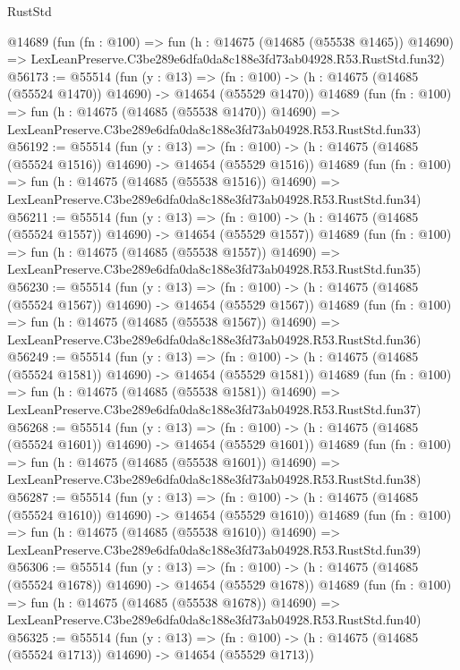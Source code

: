 \begin{lexlean}{RustStd}
\begin{coremodule}
    @14689
    (fun (fn : @100) =>
    fun (h : @14675 (@14685 (@55538 @1465)) @14690) =>
    LexLeanPreserve.C3be289e6dfa0da8c188e3fd73ab04928.R53.RustStd.fun32)
@56173 := @55514
    (fun (y : @13) =>
    (fn : @100) -> (h : @14675 (@14685 (@55524 @1470)) @14690) -> @14654 (@55529 @1470))
    @14689
    (fun (fn : @100) =>
    fun (h : @14675 (@14685 (@55538 @1470)) @14690) =>
    LexLeanPreserve.C3be289e6dfa0da8c188e3fd73ab04928.R53.RustStd.fun33)
@56192 := @55514
    (fun (y : @13) =>
    (fn : @100) -> (h : @14675 (@14685 (@55524 @1516)) @14690) -> @14654 (@55529 @1516))
    @14689
    (fun (fn : @100) =>
    fun (h : @14675 (@14685 (@55538 @1516)) @14690) =>
    LexLeanPreserve.C3be289e6dfa0da8c188e3fd73ab04928.R53.RustStd.fun34)
@56211 := @55514
    (fun (y : @13) =>
    (fn : @100) -> (h : @14675 (@14685 (@55524 @1557)) @14690) -> @14654 (@55529 @1557))
    @14689
    (fun (fn : @100) =>
    fun (h : @14675 (@14685 (@55538 @1557)) @14690) =>
    LexLeanPreserve.C3be289e6dfa0da8c188e3fd73ab04928.R53.RustStd.fun35)
@56230 := @55514
    (fun (y : @13) =>
    (fn : @100) -> (h : @14675 (@14685 (@55524 @1567)) @14690) -> @14654 (@55529 @1567))
    @14689
    (fun (fn : @100) =>
    fun (h : @14675 (@14685 (@55538 @1567)) @14690) =>
    LexLeanPreserve.C3be289e6dfa0da8c188e3fd73ab04928.R53.RustStd.fun36)
@56249 := @55514
    (fun (y : @13) =>
    (fn : @100) -> (h : @14675 (@14685 (@55524 @1581)) @14690) -> @14654 (@55529 @1581))
    @14689
    (fun (fn : @100) =>
    fun (h : @14675 (@14685 (@55538 @1581)) @14690) =>
    LexLeanPreserve.C3be289e6dfa0da8c188e3fd73ab04928.R53.RustStd.fun37)
@56268 := @55514
    (fun (y : @13) =>
    (fn : @100) -> (h : @14675 (@14685 (@55524 @1601)) @14690) -> @14654 (@55529 @1601))
    @14689
    (fun (fn : @100) =>
    fun (h : @14675 (@14685 (@55538 @1601)) @14690) =>
    LexLeanPreserve.C3be289e6dfa0da8c188e3fd73ab04928.R53.RustStd.fun38)
@56287 := @55514
    (fun (y : @13) =>
    (fn : @100) -> (h : @14675 (@14685 (@55524 @1610)) @14690) -> @14654 (@55529 @1610))
    @14689
    (fun (fn : @100) =>
    fun (h : @14675 (@14685 (@55538 @1610)) @14690) =>
    LexLeanPreserve.C3be289e6dfa0da8c188e3fd73ab04928.R53.RustStd.fun39)
@56306 := @55514
    (fun (y : @13) =>
    (fn : @100) -> (h : @14675 (@14685 (@55524 @1678)) @14690) -> @14654 (@55529 @1678))
    @14689
    (fun (fn : @100) =>
    fun (h : @14675 (@14685 (@55538 @1678)) @14690) =>
    LexLeanPreserve.C3be289e6dfa0da8c188e3fd73ab04928.R53.RustStd.fun40)
@56325 := @55514
    (fun (y : @13) =>
    (fn : @100) -> (h : @14675 (@14685 (@55524 @1713)) @14690) -> @14654 (@55529 @1713))

\end{coremodule}
\end{lexlean}
